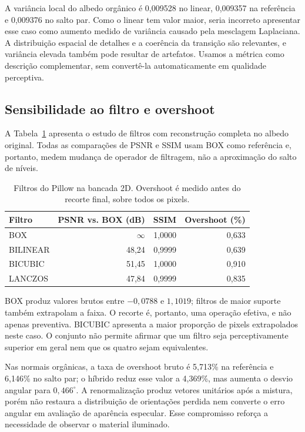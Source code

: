 A variância local do albedo orgânico é 0,009528 no linear, 0,009357 na referência e 0,009376 no salto par. Como o linear tem valor maior, seria incorreto apresentar esse caso como aumento medido de variância causado pela mesclagem Laplaciana. A distribuição espacial de detalhes e a coerência da transição são relevantes, e variância elevada também pode resultar de artefatos. Usamos a métrica como descrição complementar, sem convertê-la automaticamente em qualidade perceptiva.

\subsection{Sensibilidade ao filtro e overshoot}
A Tabela~\ref{tab:filters} apresenta o estudo de filtros com reconstrução completa no albedo original. Todas as comparações de PSNR e SSIM usam BOX como referência e, portanto, medem mudança de operador de filtragem, não a aproximação do salto de níveis.
\begin{table}[t]
\centering\small
\caption{Filtros do Pillow na bancada 2D. Overshoot é medido antes do recorte final, sobre todos os pixels.}
\label{tab:filters}
\begin{tabular}{lrrr}\toprule
Filtro & PSNR vs. BOX (dB) & SSIM & Overshoot (\%)\\\midrule
BOX & $\infty$ & 1,0000 & 0,633\\
BILINEAR & 48,24 & 0,9999 & 0,639\\
BICUBIC & 51,45 & 1,0000 & 0,910\\
LANCZOS & 47,84 & 0,9999 & 0,835\\\bottomrule
\end{tabular}
\end{table}
BOX produz valores brutos entre $-0{,}0788$ e $1{,}1019$; filtros de maior suporte também extrapolam a faixa. O recorte é, portanto, uma operação efetiva, e não apenas preventiva. BICUBIC apresenta a maior proporção de pixels extrapolados neste caso. O conjunto não permite afirmar que um filtro seja perceptivamente superior em geral nem que os quatro sejam equivalentes.

Nas normais orgânicas, a taxa de overshoot bruto é 5,713\% na referência e 6,146\% no salto par; o híbrido reduz esse valor a 4,369\%, mas aumenta o desvio angular para $0{,}466^\circ$. A renormalização produz vetores unitários após a mistura, porém não restaura a distribuição de orientações perdida nem converte o erro angular em avaliação de aparência especular. Esse compromisso reforça a necessidade de observar o material iluminado.


